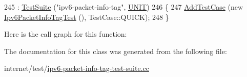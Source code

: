 \begin{DoxyCode}
245   : \hyperlink{classns3_1_1TestSuite_a904b0c40583b744d30908aeb94636d1a}{TestSuite} (\textcolor{stringliteral}{"ipv6-packet-info-tag"}, \hyperlink{classns3_1_1TestSuite_a1ebfcab34ec8161e085e8e3a1855eae0a3885375a3787abf60431f8454b3cadbd}{UNIT})
246 \{
247   \hyperlink{classns3_1_1TestCase_a3718088e3eefd5d6454569d2e0ddd835}{AddTestCase} (\textcolor{keyword}{new} \hyperlink{classIpv6PacketInfoTagTest}{Ipv6PacketInfoTagTest} (), TestCase::QUICK);
248 \}
\end{DoxyCode}


Here is the call graph for this function\+:




The documentation for this class was generated from the following file\+:\begin{DoxyCompactItemize}
\item 
internet/test/\hyperlink{ipv6-packet-info-tag-test-suite_8cc}{ipv6-\/packet-\/info-\/tag-\/test-\/suite.\+cc}\end{DoxyCompactItemize}
